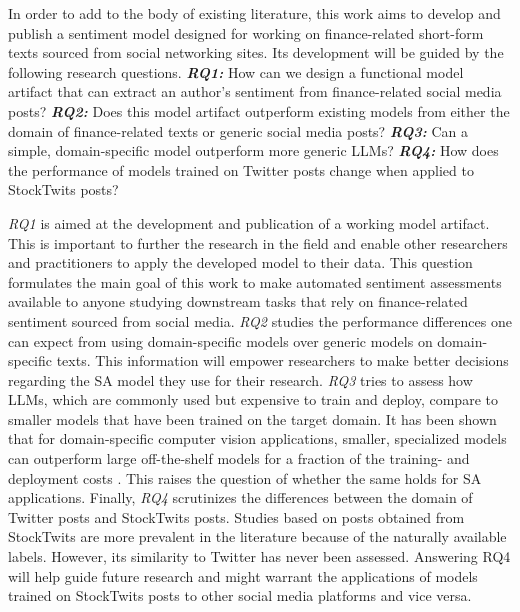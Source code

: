 In order to add to the body of existing literature, this work aims to develop and publish a sentiment model designed for working on finance-related short-form texts sourced from social networking sites. Its development will be guided by the following research questions.\newline
\textbf{\emph{RQ1:}} How can we design a functional model artifact that can extract an author's sentiment from finance-related social media posts?\newline
\textbf{\emph{RQ2:}} Does this model artifact outperform existing models from either the domain of finance-related texts or generic social media posts?\newline
\textbf{\emph{RQ3:}} Can a simple, domain-specific model outperform more generic LLMs?\newline
\textbf{\emph{RQ4:}} How does the performance of models trained on Twitter posts change when applied to StockTwits posts?

\emph{RQ1} is aimed at the development and publication of a working model artifact. This is important to further the research in the field and enable other researchers and practitioners to apply the developed model to their data. This question formulates the main goal of this work to make automated sentiment assessments available to anyone studying downstream tasks that rely on finance-related sentiment sourced from social media. \emph{RQ2} studies the performance differences one can expect from using domain-specific models over generic models on domain-specific texts. This information will empower researchers to make better decisions regarding the SA model they use for their research. \emph{RQ3} tries to assess how LLMs, which are commonly used but expensive to train and deploy, compare to smaller models that have been trained on the target domain. It has been shown that for domain-specific computer vision applications, smaller, specialized models can outperform large off-the-shelf models for a fraction of the training- and deployment costs . This raises the question of whether the same holds for SA applications. Finally, \emph{RQ4} scrutinizes the differences between the domain of Twitter posts and StockTwits posts. Studies based on posts obtained from StockTwits are more prevalent in the literature because of the naturally available labels. However, its similarity to Twitter has never been assessed. Answering RQ4 will help guide future research and might warrant the applications of models trained on StockTwits posts to other social media platforms and vice versa.


